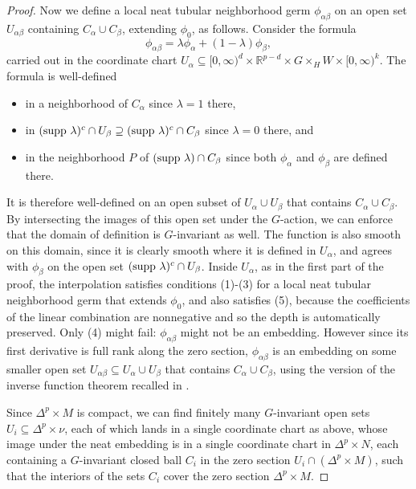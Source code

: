 \documentclass[11pt]{amsart}
\theoremstyle{definition}
\numberwithin{equation}{section}
\numberwithin{figure}{section}
\newcommand{\R}{\mathbb R}
\begin{document}
\begin{proof}
	Now we define a local neat tubular neighborhood germ $\phi_{\alpha\beta}$ on an open set $U_{\alpha\beta}$ containing $C_\alpha \cup C_\beta$, extending $\phi_0$, as follows. Consider the formula
	\[ \phi_{\alpha\beta} = \lambda \phi_\alpha + (1-\lambda) \phi_\beta, \]
	carried out in the coordinate chart $U_\alpha \subseteq [0,\infty)^d \times \R^{p-d} \times G \times_H W \times [0,\infty)^k$. The formula is well-defined
	\begin{itemize}
		\item in a neighborhood of $C_\alpha$ since $\lambda = 1$ there,
		\item in $(\textup{supp }\lambda)^c \cap U_\beta \supseteq (\textup{supp }\lambda)^c \cap C_\beta$ since $\lambda = 0$ there, and
		\item in the neighborhood $P$ of $(\textup{supp }\lambda) \cap C_\beta$ since both $\phi_\alpha$ and $\phi_\beta$ are defined there.
	\end{itemize}
	It is therefore well-defined on an open subset of $U_\alpha \cup U_\beta$ that contains $C_\alpha \cup C_\beta$. By intersecting the images of this open set under the $G$-action, we can enforce that the domain of definition is $G$-invariant as well. The function is also smooth on this domain, since it is clearly smooth where it is defined in $U_\alpha$, and agrees with $\phi_\beta$ on the open set $(\textup{supp }\lambda)^c \cap U_\beta$. Inside $U_\alpha$, as in the first part of the proof, the interpolation satisfies conditions (1)-(3) for a local neat tubular neighborhood germ that extends $\phi_0$, and also satisfies (5), because the coefficients of the linear combination are nonnegative and so the depth is automatically preserved. Only (4) might fail: $\phi_{\alpha\beta}$ might not be an embedding. However since its first derivative is full rank along the zero section, $\phi_{\alpha\beta}$ is an embedding on some smaller open set $U_{\alpha\beta} \subseteq U_\alpha \cup U_\beta$ that contains $C_\alpha \cup C_\beta$, using the version of the inverse function theorem recalled in \cite[Lem 2.18]{GIMM1}.
	
	Since $\Delta^p \times M$ is compact, we can find finitely many $G$-invariant open sets $U_i \subseteq \Delta^p \times \nu$, each of which lands in a single coordinate chart as above, whose image under the neat embedding is in a single coordinate chart in $\Delta^p \times N$, each containing a $G$-invariant closed ball $C_i$ in the zero section $U_i \cap (\Delta^p \times M)$, such that the interiors of the sets $C_i$ cover the zero section $\Delta^p \times M$.
	

\end{proof}
\end{document}
